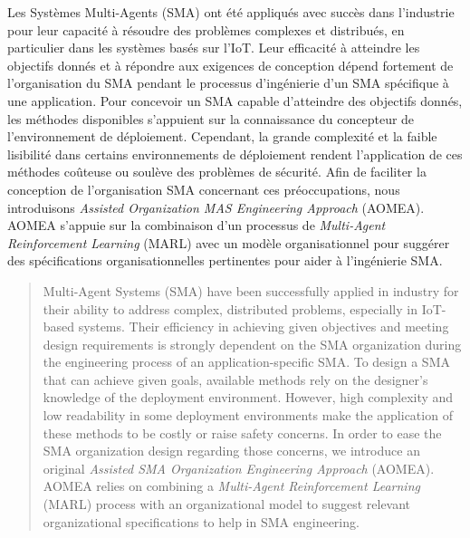 \documentclass[contribution]{jfsma}
\begin{document}
\maketitle

\begin{resume}
  Les Systèmes Multi-Agents (SMA) ont été appliqués avec succès dans l'industrie pour leur capacité à résoudre des problèmes complexes et distribués, en particulier dans les systèmes basés sur l'IoT.
  Leur efficacité à atteindre les objectifs donnés et à répondre aux exigences de conception dépend fortement de l'organisation du SMA pendant le processus d'ingénierie d'un SMA spécifique à une application. Pour concevoir un SMA capable d'atteindre des objectifs donnés, les méthodes disponibles s'appuient sur la connaissance du concepteur de l'environnement de déploiement.
  Cependant, la grande complexité et la faible lisibilité dans certains environnements de déploiement rendent l’application de ces méthodes coûteuse ou soulève des problèmes de sécurité.
  Afin de faciliter la conception de l'organisation SMA concernant ces préoccupations, nous introduisons \emph{Assisted Organization MAS Engineering Approach} (AOMEA). AOMEA s'appuie sur la combinaison d'un processus de \emph{Multi-Agent Reinforcement Learning} (MARL) avec un modèle organisationnel pour suggérer des spécifications organisationnelles pertinentes pour aider à l'ingénierie SMA.
\end{resume}


\bigskip

\begin{abstract}
  Multi-Agent Systems (SMA) have been successfully applied in industry for their ability to address complex, distributed problems, especially in IoT-based systems.
  Their efficiency in achieving given objectives and meeting design requirements is strongly dependent on the SMA organization during the engineering process of an application-specific SMA. To design a SMA that can achieve given goals, available methods rely on the designer's knowledge of the deployment environment.
  However, high complexity and low readability in some deployment environments make the application of these methods to be costly or raise safety concerns.
  In order to ease the SMA organization design regarding those concerns, we introduce an original \emph{Assisted SMA Organization Engineering Approach} (AOMEA). AOMEA relies on combining a \emph{Multi-Agent Reinforcement Learning} (MARL) process with an organizational model to suggest relevant organizational specifications to help in SMA engineering.
\end{abstract}
\end{document}
